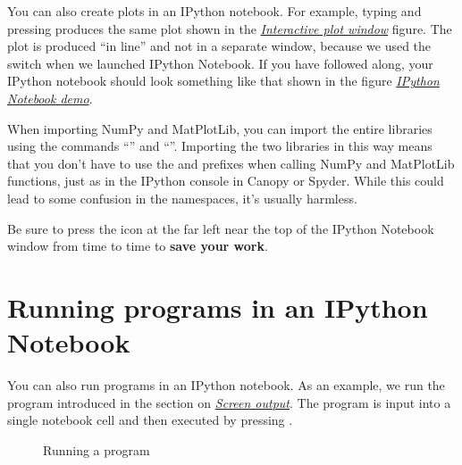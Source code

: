 \documentclass[letterpaper,10pt,english]{sphinxmanual}
\begin{document}
You can also create plots in an IPython notebook.  For example, typing  and pressing  produces  the same plot shown in the {\hyperref[chap5/chap5_plot:fig-zigzagplotdemo]{\emph{Interactive plot window}}} figure.  The plot is produced ``in line'' and not in a separate window, because we used the  switch when we launched IPython Notebook.  If you have followed along, your IPython notebook should look something like that shown in the figure {\hyperref[apdx2/apdx2_ipynb:fig-firstipynbcells]{\emph{IPython Notebook demo}}}.

When importing NumPy and MatPlotLib, you can import the entire libraries using the commands  ``'' and ``''.  Importing the two libraries in this way means that you don't have to use the  and  prefixes when calling NumPy and MatPlotLib functions, just as in the IPython console in Canopy or Spyder.  While this could lead to some confusion in the namespaces, it's usually harmless.

Be sure to press the  icon at the far left near the top of the IPython Notebook window from time to time to \textbf{save your work}.


\section{Running programs in an IPython Notebook}
\label{apdx2/apdx2_ipynb:running-programs-in-an-ipython-notebook}
You can also run programs in an IPython notebook.  As an example, we run the program introduced in the section on {\hyperref[chap4/chap4_io:screenoutput]{\emph{Screen output}}}.  The program is input into a single notebook cell and then executed by pressing .
\begin{figure}[htbp]
\centering
\capstart

\caption{Running a program}\label{apdx2/apdx2_ipynb:fig-mileagenb}\end{figure}
\end{document}

